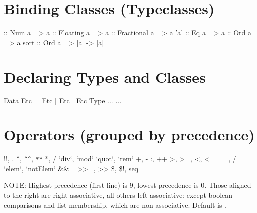 \documentclass{refcard}
\begin{document}
\section{Binding Classes (Typeclasses)}

\begin{ldesc}
	 :: Num a => a
	 :: Floating a => a
	 :: Fractional a => a
	\li[Equatable (==)]                'a' :: Eq a => a
	 :: Ord a => a
	\li                                sort :: 
	\li                                \s\s\s\s Ord a => [a] -> [a]
\end{ldesc}


\section{Declaring Types and Classes}

\begin{ldesc}
	\li[data] Data Etc = Etc | Etc | Etc
	\li[type] Type ...
	\li[class] ...
\end{ldesc}


\section{Operators (grouped by precedence)}

\begin{Ldesc}
	 !!, \hfill .
	 \hfill \verb+^+, \verb+^^+, \verb+**+
	 *, /
	 `div`, `mod`
	 `quot`, `rem`
	 +, -
	 \hfill :, ++
	 >, >=, <, <=
	 ==, /=
	 `elem`, `notElem`
	 \hfill \&\&
	\Li[boolean or] \hfill ||
	 >>=, >>
	 \$, \$!, seq
\end{Ldesc}

\noindent
NOTE: Highest precedence (first line) is 9, lowest precedence is 0.  Those
aligned to the right are right associative, all others left associative: except
boolean comparisons and list membership, which are non-associative.  Default is
.
\end{document}
